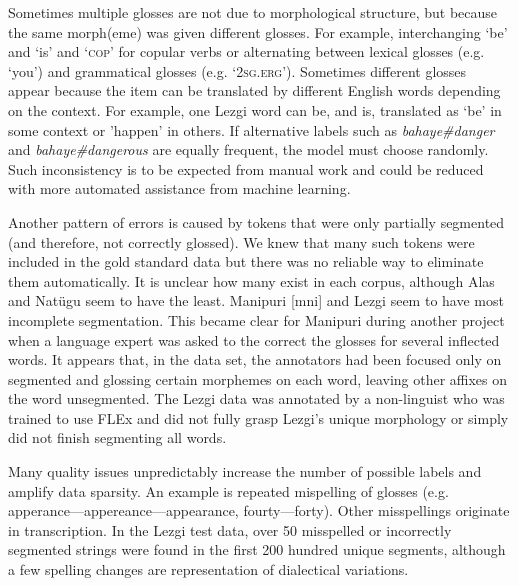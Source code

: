 Sometimes multiple glosses are not due to morphological structure, but because the same morph(eme) was given different glosses. For example, interchanging `be' and `is' and `\textsc{cop}' for copular verbs or alternating between lexical glosses (e.g. `you') and grammatical glosses (e.g. `\textsc{2sg.erg}'). Sometimes different glosses appear because the item can be translated by different English words depending on the context. For example, one Lezgi word can be, and is, translated as `be' in some context or 'happen' in others. If alternative labels such as \textit{bahaye\#danger} and \textit{bahaye\#dangerous} are equally frequent, the model must choose randomly. Such inconsistency is to be expected from manual work and could be reduced with more automated assistance from machine learning.

Another pattern of errors is caused by tokens that were only partially segmented (and therefore, not correctly glossed). We knew that many such tokens were included in the gold standard data but there was no reliable way to eliminate them automatically. It is unclear how many exist in each corpus, although Alas and Nat\"ugu seem to have the least. Manipuri [mni] and Lezgi seem to have most incomplete segmentation. This became clear for Manipuri during another project when a language expert was asked to the correct the glosses for several inflected words. It appears that, in the data set, the annotators had been focused only on segmented and glossing certain morphemes on each word, leaving other affixes on the word unsegmented. 
The Lezgi data was annotated by a non-linguist who was trained to use FLEx and did not fully grasp Lezgi's unique morphology or simply did not finish segmenting all words. 

Many quality issues unpredictably increase the number of possible labels and amplify data sparsity. An example is
repeated mispelling of glosses (e.g. apperance---appereance---appearance, fourty---forty). Other misspellings originate in transcription. In the Lezgi test data, over 50 misspelled or incorrectly segmented strings were found in the first 200 hundred unique segments, although a few spelling changes are representation of dialectical variations.  


